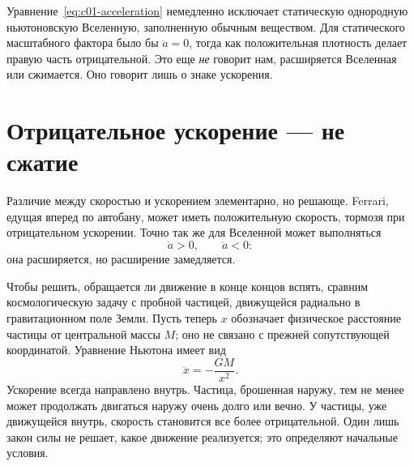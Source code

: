 \begin{classroomqa}
\end{classroomqa}

\begin{classroomqa}
\end{classroomqa}

Уравнение~\eqref{eq:c01-acceleration} немедленно исключает статическую однородную ньютоновскую Вселенную, заполненную обычным веществом. Для статического масштабного фактора было бы \(\ddot a=0\), тогда как положительная плотность делает правую часть отрицательной. Это еще \emph{не} говорит нам, расширяется Вселенная или сжимается. Оно говорит лишь о знаке ускорения.

\section{Отрицательное ускорение — не сжатие}

Различие между скоростью и ускорением элементарно, но решающе. Ferrari, едущая вперед по автобану, может иметь положительную скорость, тормозя при отрицательном ускорении. Точно так же для Вселенной может выполняться
\begin{equation}
\dot a>0,
\qquad
\ddot a<0:
\end{equation}
она расширяется, но расширение замедляется.

Чтобы решить, обращается ли движение в конце концов вспять, сравним космологическую задачу с пробной частицей, движущейся радиально в гравитационном поле Земли. Пусть теперь \(x\) обозначает физическое расстояние частицы от центральной массы \(M\); оно не связано с прежней сопутствующей координатой. Уравнение Ньютона имеет вид
\begin{equation}
\ddot x=-\frac{GM}{x^2}.
\label{eq:c01-particle-force}
\end{equation}
Ускорение всегда направлено внутрь. Частица, брошенная наружу, тем не менее может продолжать двигаться наружу очень долго или вечно. У частицы, уже движущейся внутрь, скорость становится все более отрицательной. Один лишь закон силы не решает, какое движение реализуется; это определяют начальные условия.

